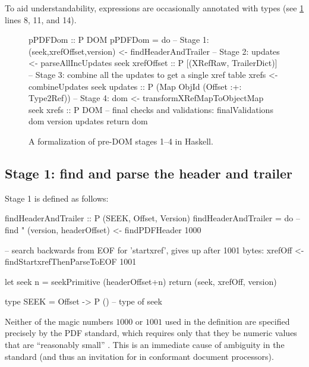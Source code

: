 To aid understandability, expressions are occasionally annotated with types (see \cref{fig:spec} lines 8, 11, and 14).

\begin{figure}[t]
\centering
\lstset{numbers=right}
\begin{code}
pPDFDom :: P DOM
pPDFDom =
    do
    -- Stage 1:
    (seek,xrefOffset,version) <- findHeaderAndTrailer
    -- Stage 2:
    updates <- parseAllIncUpdates seek xrefOffset
               :: P [(XRefRaw, TrailerDict)]
    -- Stage 3: combine all the updates to get a single xref table
    xrefs <- combineUpdates seek updates
             :: P (Map ObjId (Offset :+: Type2Ref))
    -- Stage 4:
    dom <- transformXRefMapToObjectMap seek xrefs
           :: P DOM
    -- final checks and validations:
    finalValidations dom version updates
    return dom
\end{code}
\caption{A formalization of pre-DOM stages 1--4 in Haskell.}
\label{fig:spec}
\end{figure}


\subsection{Stage 1: find and parse the header and trailer}
\label{sec:stage-1}

Stage 1 is defined as follows:
\begin{code}
findHeaderAndTrailer :: P (SEEK, Offset, Version)
findHeaderAndTrailer =
    do
    -- find "%
    (version, headerOffset) <- findPDFHeader 1000

    -- search backwards from EOF for 'startxref', gives up after 1001 bytes:
    xrefOff <- findStartxrefThenParseToEOF 1001
    
    let seek n = seekPrimitive (headerOffset+n)
    return (seek, xrefOff, version)
    
type SEEK = Offset -> P () -- type of seek
\end{code}

Neither of the magic numbers $1000$ or $1001$ used in the definition are specified precisely
by the PDF standard, which requires only that they be numeric values
that are ``reasonably small'' .
%
This is an immediate cause of ambiguity in the standard (and thus an
invitation for \pd{} in conformant document processors).


